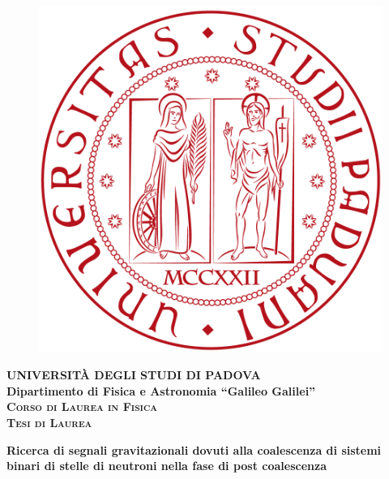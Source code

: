 \begin{titlepage}
	\vspace{5mm}
	\begin{figure}[hbtp]
		\centering
		\includegraphics[scale=.13]{figures/Frontespizio/UNIPD.png}
	\end{figure}
	
	\vspace{5mm}
	
	\begin{center}
		{{\huge{\textsc{\bf UNIVERSIT\`A DEGLI STUDI DI PADOVA}}}\\}
		\vspace{5mm}
		{\Large{\bf Dipartimento di Fisica e Astronomia ``Galileo Galilei''}} \\
		\vspace{5mm}
		{\Large{\textsc{\bf Corso di Laurea in Fisica}}}\\
		\vspace{20mm}
		{\Large{\textsc{\bf Tesi di Laurea}}}\\
		\vspace{30mm}
		\begin{spacing}{3}
			{\LARGE \textbf{Ricerca di segnali gravitazionali dovuti alla coalescenza di sistemi binari di stelle di neutroni nella fase di post coalescenza}}\\
		\end{spacing}
		\vspace{8mm}
	\end{center}
	

\end{titlepage}
